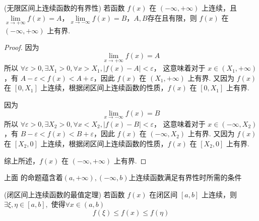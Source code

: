 \begin{corollary}(无限区间上连续函数的有界性)
	若函数 \( f(x) \) 在 \((-\infty, +\infty)\) 上连续，且 \(\lim\limits_{x \to +\infty} f(x) = A\)，\(\lim\limits_{x \to -\infty} f(x) = B\)，$A,B$存在且有限，则 \( f(x) \) 在 \((-\infty, +\infty)\) 上有界.
	
	
\end{corollary}
\begin{proof}
	因为 $$\lim_{x \to +\infty} f(x) = A$$
	所以 \(\forall \varepsilon > 0, \exists X_1 > 0, \forall x > X_1, |f(x) - A| < \varepsilon\)，
	这意味着对于 \(x \in (X_1, +\infty)\)，有 \(A - \varepsilon < f(x) < A + \varepsilon\)，因此 \(f(x)\) 在 \((X_1, +\infty)\) 上有界.
	又因为 \(f(x)\) 在 \([0, X_1]\) 上连续，根据闭区间上连续函数的性质，\(f(x)\) 在 \([0, X_1]\) 上有界.
	
	因为 \[\lim\limits_{x \to -\infty} f(x) = B\]
	所以 \(\forall \varepsilon > 0, \exists X_2 > 0, \forall x < X_2, |f(x) - B| < \varepsilon\)，
	这意味着对于 \(x \in (-\infty, X_2)\)，有 \(B - \varepsilon < f(x) < B + \varepsilon\)，因此 \(f(x)\) 在 \((-\infty, X_2)\) 上有界.
	又因为 \(f(x)\) 在 \([X_2, 0]\) 上连续，根据闭区间上连续函数的性质，\(f(x)\) 在 \([X_2, 0]\) 上有界.
	
	综上所述，\(f(x)\) 在 \((-\infty, +\infty)\) 上有界.
\end{proof}
上面 的命题蕴含着$(a,+\infty),(-\infty,b)$上连续函数满足有界性时所需的条件
\begin{proposition}(闭区间上连续函数的最值定理)
	若函数 \( f(x) \) 在闭区间 \([a, b]\) 上连续，则 \( \exists \xi, \eta \in [a, b], \) 使得$\forall x\in(a,b)$
	$$ f(\xi) \leqslant f(x)\leqslant f(\eta) $$
	\label{闭区间上连续函数的最值定理}
\end{proposition}
